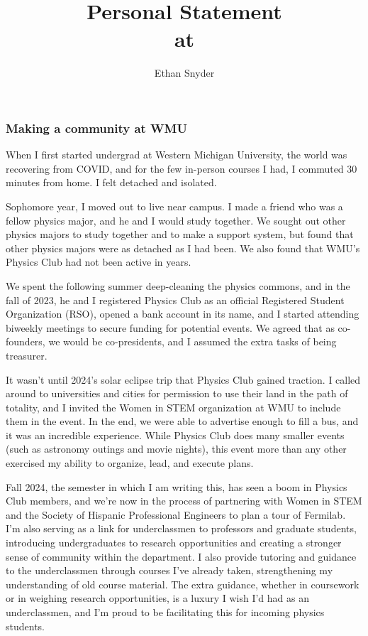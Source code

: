 \documentclass[11pt]{article}
\title{\vspace{-5em}Personal Statement\\
	\large \dept{} at \school{}}
\author{Ethan Snyder}
\date{}
\begin{document}
\maketitle
\subsubsection*{Making a community at WMU}
When I first started undergrad at Western Michigan University, the world was recovering from COVID, and for the few in-person courses I had, I commuted 30 minutes from home. I felt detached and isolated.

Sophomore year, I moved out to live near campus. I made a friend who was a fellow physics major, and he and I would study together. We sought out other physics majors to study together and to make a support system, but found that other physics majors were as detached as I had been. We also found that WMU's Physics Club had not been active in years.

We spent the following summer deep-cleaning the physics commons, and in the fall of 2023, he and I registered Physics Club as an official Registered Student Organization (RSO), opened a bank account in its name, and I started attending biweekly meetings to secure funding for potential events. We agreed that as co-founders, we would be co-presidents, and I assumed the extra tasks of being treasurer.

It wasn't until 2024's solar eclipse trip that Physics Club gained traction. I called around to universities and cities for permission to use their land in the path of totality, and I invited the Women in STEM organization at WMU to include them in the event. In the end, we were able to advertise enough to fill a bus, and it was an incredible experience. While Physics Club does many smaller events (such as astronomy outings and movie nights), this event more than any other exercised my ability to organize, lead, and execute plans.

Fall 2024, the semester in which I am writing this, has seen a boom in Physics Club members, and we're now in the process of partnering with Women in STEM and the Society of Hispanic Professional Engineers to plan a tour of Fermilab. I'm also serving as a link for underclassmen to professors and graduate students, introducing undergraduates to research opportunities and creating a stronger sense of community within the department. I also provide tutoring and guidance to the underclassmen through courses I've already taken, strengthening my understanding of old course material. The extra guidance, whether in coursework or in weighing research opportunities, is a luxury I wish I'd had as an underclassmen, and I'm proud to be facilitating this for incoming physics students.
\end{document}
